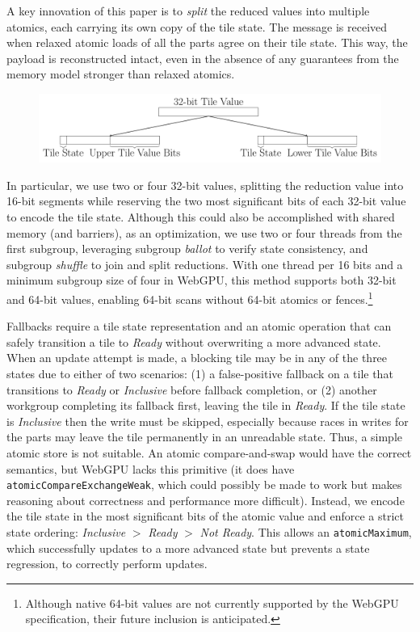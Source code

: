 \documentclass[sigconf]{acmart}
\begin{document}
A key innovation of this paper is to \emph{split} the reduced values into multiple atomics, each carrying its own copy of the tile state. The message is received when relaxed atomic loads of all the parts agree on their tile state. This way, the payload is reconstructed intact, even in the absence of any guarantees from the memory model stronger than relaxed atomics.

\begin{figure}[h!]
  \centering
  \includegraphics[width=\linewidth]{graphics/split.pdf}
\end{figure}

In particular, we use two or four 32-bit values, splitting the reduction value into 16-bit segments while reserving the two most significant bits of each 32-bit value to encode the tile state. Although this could also be accomplished with shared memory (and barriers), as an optimization, we use two or four threads from the first subgroup, leveraging subgroup \emph{ballot} to verify state consistency, and subgroup \emph{shuffle} to join and split reductions. With one thread per 16 bits and a minimum subgroup size of four in WebGPU, this method supports both 32-bit and 64-bit values, enabling 64-bit scans without 64-bit atomics or fences.\footnote{Although native 64-bit values are not currently supported by the WebGPU specification, their future inclusion is anticipated.}

Fallbacks require a tile state representation and an atomic operation that can safely transition a tile to \emph{Ready} without overwriting a more advanced state. When an update attempt is made, a blocking tile may be in any of the three states due to either of two scenarios: (1) a false-positive fallback on a tile that transitions to \emph{Ready} or \emph{Inclusive} before fallback completion, or (2) another workgroup completing its fallback first, leaving the tile in \emph{Ready}. If the tile state is \emph{Inclusive} then the write must be skipped, especially because races in writes for the parts may leave the tile permanently in an unreadable state. Thus, a simple atomic store is not suitable. An atomic compare-and-swap would have the correct semantics, but WebGPU lacks this primitive (it does have \texttt{atomicCompareExchangeWeak}, which could possibly be made to work but makes reasoning about correctness and performance more difficult). Instead, we encode the tile state in the most significant bits of the atomic value and enforce a strict state ordering: \emph{Inclusive} $>$ \emph{Ready} $>$ \emph{Not Ready}. This allows an \texttt{atomicMaximum}, which successfully updates to a more advanced state but prevents a state regression, to correctly perform updates.
\end{document}
